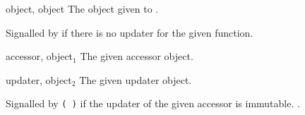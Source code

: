 \begin{optDefinition}
%
\begin{initoptions}
    \item[object, object] The object given to .
\end{initoptions}
%
\remarks%
Signalled by  if there is no updater for the given
function.

%
\begin{initoptions}
    \item[accessor, object$_1$] The given accessor object.

    \item[updater, object$_2$] The given updater object.
\end{initoptions}
%
\remarks%
Signalled by {\tt ( )} if the updater of
the given accessor is immutable.
%
\seealso%
.
%
\end{optDefinition}

